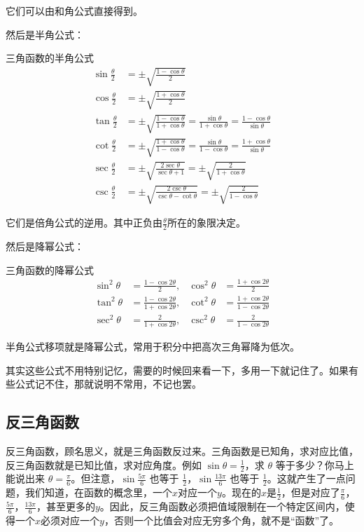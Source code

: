 它们可以由和角公式直接得到。

然后是半角公式：
\begin{theorem}{三角函数的半角公式}{}
\[
\begin{aligned}
\sin\frac{\theta}{2} &= \pm \sqrt{\frac{1 - \cos\theta}{2}}\\
\cos\frac{\theta}{2} &= \pm \sqrt{\frac{1 + \cos\theta}{2}}\\
\tan\frac{\theta}{2} &= \pm \sqrt{\frac{1 - \cos\theta}{1 + \cos\theta}} = \frac{\sin\theta}{1 + \cos\theta} = \frac{1 - \cos\theta}{\sin\theta}\\
\cot\frac{\theta}{2} &= \pm \sqrt{\frac{1 + \cos\theta}{1 - \cos\theta}} = \frac{\sin\theta}{1 - \cos\theta} = \frac{1 + \cos\theta}{\sin\theta}\\
\sec\frac{\theta}{2} &= \pm \sqrt{\frac{2\sec\theta}{\sec\theta + 1}} = \pm \sqrt{\frac{2}{1 + \cos\theta}}\\
\csc\frac{\theta}{2} &= \pm \sqrt{\frac{2\csc\theta}{\csc\theta - \cot\theta}} = \pm \sqrt{\frac{2}{1 - \cos\theta}}
\end{aligned}
\]
\end{theorem}
它们是倍角公式的逆用。其中正负由\(\frac{\theta }{2}\)所在的象限决定。

然后是降幂公式：
\begin{theorem}{三角函数的降幂公式}{}
\[
\begin{aligned}
\sin^2\theta &= \frac{1 - \cos 2\theta}{2}, & \cos^2\theta &= \frac{1 + \cos 2\theta}{2} \\[6pt]
\tan^2\theta &= \frac{1 - \cos 2\theta}{1 + \cos 2\theta}, & \cot^2\theta &= \frac{1 + \cos 2\theta}{1 - \cos 2\theta} \\[6pt]
\sec^2\theta &= \frac{2}{1 + \cos 2\theta}, & \csc^2\theta &= \frac{2}{1 - \cos 2\theta}
\end{aligned}
\]
\end{theorem}

半角公式移项就是降幂公式，常用于积分中把高次三角幂降为低次。

其实这些公式不用特别记忆，需要的时候回来看一下，多用一下就记住了。如果有些公式记不住，那就说明不常用，不记也罢。

\subsection{反三角函数}

反三角函数，顾名思义，就是三角函数反过来。三角函数是已知角，求对应比值，反三角函数就是已知比值，求对应角度。例如 $\sin\theta = \frac{1}{2}$，求 $\theta$ 等于多少？你马上能说出来 $\theta=\frac{\pi}{6}$。但注意，$\sin\frac{5\pi}{6}$ 也等于 $\frac{1}{2}$，$\sin\frac{13\pi}{6}$ 也等于 $\frac{1}{2}$。这就产生了一点问题，我们知道，在函数的概念里，一个$x$对应一个$y$。现在的$x$是$\frac{1}{2}$，但是对应了$\frac{\pi}{6}$，$\frac{5\pi}{6}$，$\frac{13\pi}{6}$，甚至更多的$y$。因此，反三角函数必须把值域限制在一个特定区间内，使得一个$x$必须对应一个$y$，否则一个比值会对应无穷多个角，就不是“函数”了。

